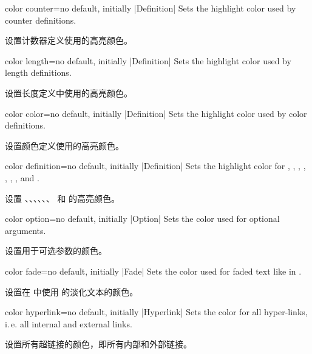 \begin{docTcbKey}[][doc new={2015-01-08}]{color counter}{=}{no default, initially |Definition|}
Sets the highlight color used by counter definitions.

设置计数器定义使用的高亮颜色。
\end{docTcbKey}

\begin{docTcbKey}[][doc new={2015-01-08}]{color length}{=}{no default, initially |Definition|}
Sets the highlight color used by length definitions.

设置长度定义中使用的高亮颜色。
\end{docTcbKey}

\begin{docTcbKey}{color color}{=}{no default, initially |Definition|}
Sets the highlight color used by color definitions.

设置颜色定义使用的高亮颜色。
\end{docTcbKey}

\begin{docTcbKey}[][doc updated={2019-09-18}]{color definition}{=}{no default, initially |Definition|}
Sets the highlight color for , ,
, , , ,
, and .

设置 、、、、、、 和  的高亮颜色。
\end{docTcbKey}

\begin{docTcbKey}{color option}{=}{no default, initially |Option|}
Sets the color used for optional arguments.

设置用于可选参数的颜色。
\end{docTcbKey}

\begin{docTcbKey}{color fade}{=}{no default, initially |Fade|}
Sets the color used for faded text like 
in .

设置在 中使用 的淡化文本的颜色。
\end{docTcbKey}


\begin{docTcbKey}{color hyperlink}{=}{no default, initially |Hyperlink|}
Sets the color for all hyper-links, i.\,e. all internal and external links.

设置所有超链接的颜色，即所有内部和外部链接。
\end{docTcbKey}
